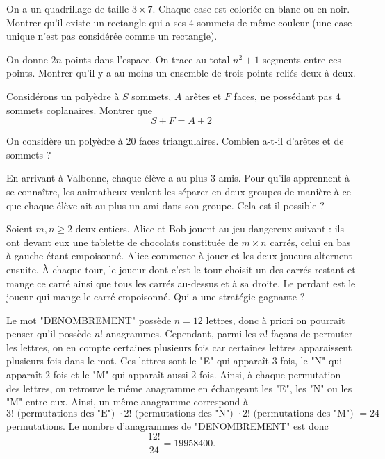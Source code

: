 \begin{exo}
On a un quadrillage de taille $3 \times 7$. Chaque case est coloriée en blanc ou en noir. Montrer qu'il existe un rectangle qui a ses 4 sommets de même couleur (une case unique n'est pas considérée comme un rectangle).
\end{exo}

\begin{exo}
On donne $2n$ points dans l'espace. On trace au total $n^2+1$ segments entre ces points. Montrer qu'il y a au moins un ensemble de trois points reliés deux à deux.
\end{exo}

\begin{exo}
Considérons un polyèdre à $S$ sommets, $A$ arêtes et $F$ faces, ne possédant pas $4$ sommets coplanaires. Montrer que
$$S+F = A+2$$
\end{exo}

\begin{exo}
On considère un polyèdre à $20$ faces triangulaires. Combien a-t-il d'arêtes et de sommets ?
\end{exo}

\begin{exo}
En arrivant à Valbonne, chaque élève a au plus 3 amis. Pour qu'ils apprennent à se connaître, les animatheux veulent les séparer en deux groupes de manière à ce que chaque élève ait au plus un ami dans son groupe. Cela est-il possible ?
\end{exo}


\begin{exo}[Difficile]
Soient $m,n\ge 2$ deux entiers. Alice et Bob jouent au jeu dangereux suivant : ils ont devant eux une tablette de chocolats constituée de $m\times n$ carrés, celui en bas à gauche étant empoisonné. Alice commence à jouer et les deux joueurs alternent ensuite. À chaque tour, le joueur dont c'est le tour choisit un des carrés restant et mange ce carré ainsi que tous les carrés au-dessus et à sa droite. Le perdant est le joueur qui mange le carré empoisonné. Qui a une stratégie gagnante ?
\end{exo}


\begin{sol}
Le mot "DENOMBREMENT" possède $n=12$ lettres, donc à priori on pourrait penser qu'il possède $n!$ anagrammes. Cependant, parmi les $n!$ façons de permuter les lettres, on en compte certaines plusieurs fois car certaines lettres apparaissent plusieurs fois dans le mot. Ces lettres sont le "E" qui apparaît $3$ fois, le "N" qui apparaît $2$ fois et le "M" qui apparaît aussi $2$ fois. Ainsi, à chaque permutation des lettres, on retrouve le même anagramme en échangeant les "E", les "N" ou les "M" entre eux. Ainsi, un même anagramme correspond à
$$3!\text{ (permutations des "E") }\cdot 2!\text{ (permutations des "N") }\cdot 2!\text{ (permutations des "M") }=24$$
permutations. Le nombre d'anagrammes de "DENOMBREMENT" est donc
$$\frac{12!}{24}=19958400.$$
\end{sol}

